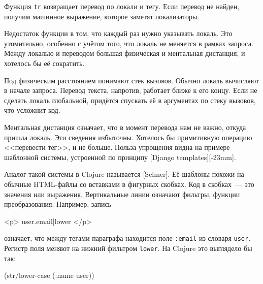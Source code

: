 \fi


Функция \verb|tr| возвращает перевод по локали и тегу. Если перевод не найден,
получим машинное выражение, которое заметят локализаторы.

Недостаток функции в том, что каждый раз нужно указывать локаль. Это
утомительно, особенно с учётом того, что локаль не меняется в рамках
запроса. Между локалью и переводом большая физическая и ментальная
дистанция, и хотелось бы её сократить.


Под физическим расстоянием понимают стек вызовов. Обычно локаль вычисляют в
начале запроса. Перевод текста, напротив, работает ближе к его концу. Если не
сделать локаль глобальной, придётся спускать её в аргументах по стеку вызовов,
что усложнит код.


Ментальная дистанция означает, что в момент перевода нам не важно, откуда пришла
локаль. Эти сведения избыточны. Хотелось бы примитивную операцию <<перевести
тег>>, и не больше. Польза упрощения видна на примере шаблонной системы,
устроенной по принципу [Django templates][-23mm].


Аналог такой системы в Clojure называется
[Selmer]. Её шаблоны похожи на
обычные HTML-файлы со вставками в фигурных скобках. Код в скобках~--- это значения
или выражения. Вертикальные линии означают фильтры, функции
преобразования. Например, запись

\begin{english}
  \begin{htmldjango}
<p>{{ user.email|lower }}</p>
  \end{htmldjango}
\end{english}

\noindent
означает, что между тегами параграфа находится поле \verb|:email| из словаря
\verb|user|. Регистр поля меняют на нижний фильтром \verb|lower|. На Clojure
это выглядело бы так:

\begin{english}
  \begin{clojure}
(str/lower-case (:name user))
  \end{clojure}
\end{english}

